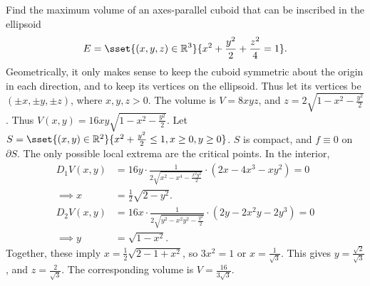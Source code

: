 \begin{examples}
    \item Find the maximum volume of an axes-parallel cuboid that can be
    inscribed in the ellipsoid \[
        E = \sset{(x, y, z) \in \R^3}
            {x^2 + \frac{y^2}{2} + \frac{z^2}{4} = 1}.
    \]
    Geometrically, it only makes sense to keep the cuboid symmetric about
    the origin in each direction, and to keep its vertices on the ellipsoid.
    Thus let its vertices be $(\pm x, \pm y, \pm z)$, where $x, y, z > 0$.
    The volume is $V = 8xyz$, and
    $z = 2 \sqrt{1 - x^2 - \frac{y^2}{2}}$.
    Thus $V(x, y) = 16 xy \sqrt{1 - x^2 - \frac{y^2}{2}}$.
    Let $S = \sset{(x, y) \in \R^2}
    {x^2 + \frac{y^2}{2} \le 1, x \ge 0, y \ge 0}$.
    $S$ is compact, and $f \equiv 0$ on $\partial S$.
    The only possible local extrema are the critical points.
    In the interior,
    \begin{align*}
        D_1 V(x, y) &= 16 y \cdot \frac1{2 \sqrt{x^2 - x^4 - \frac{x^2y^2}{2}}}
            \cdot (2x - 4x^3 - xy^2) = 0 \\
        \implies x &= \frac12 \sqrt{2 - y^2}. \\
        D_2 V(x, y) &= 16 x \cdot \frac1{2 \sqrt{y^2 - x^2 y^2 - \frac{y^4}{2}}}
            \cdot (2y - 2x^2y - 2y^3) = 0 \\
        \implies y &= \sqrt{1 - x^2}.
    \end{align*}
    Together, these imply $x = \frac12 \sqrt{2 - 1 + x^2}$, so
    $3x^2 = 1$ or $x = \frac1{\sqrt3}$.
    This gives $y = \frac{\sqrt2}{\sqrt3}$, and
    $z = \frac 2{\sqrt3}$.
    The corresponding volume is $V = \frac{16}{3\sqrt3}$.
\end{examples}
